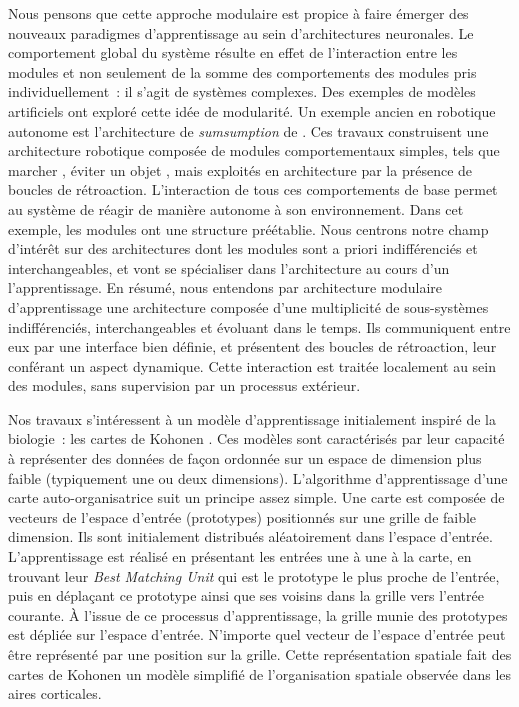 Nous pensons que cette approche modulaire est propice à faire émerger des nouveaux paradigmes d'apprentissage au sein d'architectures neuronales. 
Le comportement global du système résulte en effet de l'interaction entre les modules et non seulement de la somme des comportements des modules pris individuellement~: il s'agit de systèmes complexes. 
Des exemples de modèles artificiels ont exploré cette idée de modularité. Un exemple ancien en robotique autonome est l'architecture de \emph{sumsumption} de \cite{brooks_sumsumption_85}. Ces travaux construisent une architecture robotique composée de modules comportementaux simples, tels que \og marcher \fg{}, \og éviter un objet \fg{}, mais exploités en architecture par la présence de boucles de rétroaction. L'interaction de tous ces comportements de base permet au système de réagir de manière autonome à son environnement. 
Dans cet exemple, les modules ont une structure préétablie.
Nous centrons notre champ d'intérêt sur des architectures dont les modules sont a priori indifférenciés et interchangeables, et vont se spécialiser dans l'architecture au cours d'un l'apprentissage.
En résumé, nous entendons par architecture modulaire d'apprentissage une architecture composée d'une multiplicité de sous-systèmes indifférenciés, interchangeables et évoluant dans le temps.
Ils communiquent entre eux par une interface bien définie, et présentent des boucles de rétroaction, leur conférant un aspect dynamique. Cette interaction est traitée localement au sein des modules, sans supervision par un processus extérieur.

Nos travaux s'intéressent à un modèle d'apprentissage initialement inspiré de la biologie~: les cartes de Kohonen \parencite{Kohonen1982}.
Ces modèles sont caractérisés par leur capacité à représenter des données de façon ordonnée sur un espace de dimension plus faible (typiquement une ou deux dimensions).
L'algorithme d'apprentissage d'une carte auto-organisatrice suit un principe assez simple. Une carte est composée de vecteurs de l'espace d'entrée (prototypes) positionnés sur une grille de faible dimension.
Ils sont initialement distribués aléatoirement dans l'espace d'entrée. 
L'apprentissage est réalisé en présentant les entrées une à une à la carte, en trouvant leur \emph{Best Matching Unit} qui est le prototype le plus proche de l'entrée, puis en déplaçant ce prototype ainsi que ses voisins dans la grille vers l'entrée courante.
\`A l'issue de ce processus d'apprentissage, la grille munie des prototypes est dépliée sur l'espace d'entrée. N'importe quel vecteur de l'espace d'entrée peut être représenté par une position sur la grille.
Cette représentation spatiale fait des cartes de Kohonen un modèle simplifié de l'organisation spatiale observée dans les aires corticales.

